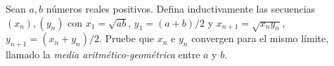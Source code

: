 
Sean $a,b$ números reales positivos. Defina inductivamente las secuencias $(x_n), (y_n)$ con
$x_1 = \sqrt{ab}$, $y_1 = (a+b)/2$ y $x_{n+1} = \sqrt{x_ny_n}$, $y_{n+1} = (x_n+y_n)/2$.
Pruebe que $x_n$ e $y_n$ convergen para el mismo límite, llamado la \emph{media aritmético-geométrica} entre $a$ y $b$.